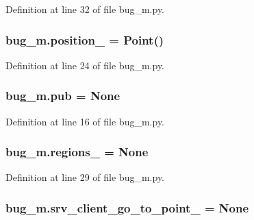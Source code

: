 Definition at line 32 of file bug\+\_\+m.\+py.

\subsubsection[{\texorpdfstring{position\+\_\+}{position_}}]{\setlength{\rightskip}{0pt plus 5cm}bug\+\_\+m.\+position\+\_\+ = Point()}\hypertarget{namespacebug__m_ab108d02234aa3ec58605b9f6980ec090}{}\label{namespacebug__m_ab108d02234aa3ec58605b9f6980ec090}


Definition at line 24 of file bug\+\_\+m.\+py.

\subsubsection[{\texorpdfstring{pub}{pub}}]{\setlength{\rightskip}{0pt plus 5cm}bug\+\_\+m.\+pub = None}\hypertarget{namespacebug__m_adc14150838edf40c8028207cd6bb2082}{}\label{namespacebug__m_adc14150838edf40c8028207cd6bb2082}


Definition at line 16 of file bug\+\_\+m.\+py.

\subsubsection[{\texorpdfstring{regions\+\_\+}{regions_}}]{\setlength{\rightskip}{0pt plus 5cm}bug\+\_\+m.\+regions\+\_\+ = None}\hypertarget{namespacebug__m_ac9d4d95c034fca5a2b5d08ea845bbfcb}{}\label{namespacebug__m_ac9d4d95c034fca5a2b5d08ea845bbfcb}


Definition at line 29 of file bug\+\_\+m.\+py.

\subsubsection[{\texorpdfstring{srv\+\_\+client\+\_\+go\+\_\+to\+\_\+point\+\_\+}{srv_client_go_to_point_}}]{\setlength{\rightskip}{0pt plus 5cm}bug\+\_\+m.\+srv\+\_\+client\+\_\+go\+\_\+to\+\_\+point\+\_\+ = None}\hypertarget{namespacebug__m_abd32bbd25b55f71e56505e72ba56c2f6}{}\label{namespacebug__m_abd32bbd25b55f71e56505e72ba56c2f6}


